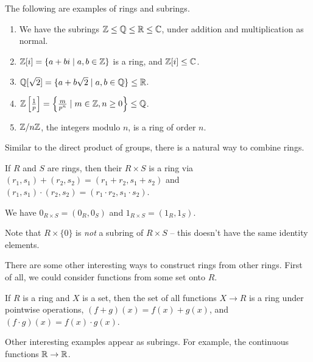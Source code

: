 \documentclass[a4paper]{scrreprt}
\begin{document}
 \begin{example}
	 The following are examples of rings and subrings.
	 \begin{enumerate}[label=(\roman*)]
		 \item We have the subrings $\mathbb{Z} \leq \mathbb{Q} \leq \mathbb{R} \leq \mathbb{C}$, under addition and multiplication as normal.
		 \item $\mathbb{Z}[i] = \{a + bi \mid a, b \in \mathbb{Z}\}$ is a ring, and $\mathbb{Z}[i] \leq \mathbb{C}$.
		 \item $\mathbb{Q}[\sqrt{2}] = \{a + b\sqrt{2} \mid a, b \in \mathbb{Q}\} \leq \mathbb{R}$.
		 \item $\mathbb{Z}\left[\frac{1}{p}\right] = \left\{
			\frac{m}{p^n} \mid m \in \mathbb{Z}, n \geq 0
		 \right\} \leq \mathbb{Q}$.
		\item $\mathbb{Z}/n\mathbb{Z}$, the integers modulo $n$, is a ring of order $n$.
	 \end{enumerate}
 \end{example}



 Similar to the direct product of groups, there is a natural way to combine rings.

 \begin{definition}
	 If $R$ and $S$ are rings, then their  $R \times S$ is a ring via $(r_1, s_1) + (r_2, s_2) = (r_1 + r_2, s_1 + s_2)$ and $(r_1, s_1) \cdot (r_2, s_2) = (r_1 \cdot r_2, s_1 \cdot s_2)$.

	We have $0_{R \times S} = (0_R, 0_S)$ and $1_{R \times S} = (1_R, 1_S)$.
 \end{definition}

 \begin{remark}
	 Note that $R \times \{0 \}$ is \emph{not} a subring of $R \times S$ -- this doesn't have the same identity elements.
 \end{remark}

 There are some other interesting ways to construct rings from other rings. First of all, we could consider functions from some set onto $R$.

 \begin{definition}
	If $R$ is a ring and $X$ is a set, then the set of all functions $X \rightarrow R$ is a ring under pointwise operations, $(f + g)(x) = f(x) + g(x)$, and $(f \cdot g)(x) = f(x) \cdot g(x)$.  
 \end{definition}

 Other interesting examples appear as subrings. For example, the continuous functions $\mathbb{R} \rightarrow \mathbb{R}$.
\end{document}
